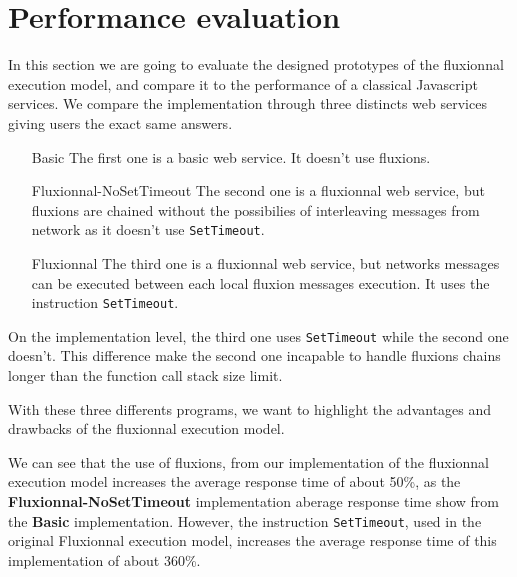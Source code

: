 \section{Performance evaluation}

In this section we are going to evaluate the designed prototypes of the fluxionnal execution model, and compare it to the performance of a classical Javascript services.
We compare the implementation through three distincts web services giving users the exact same answers.
\begin{itemize}
	\item[Basic] The first one is a basic web service. It doesn't use fluxions.
	\item[Fluxionnal-NoSetTimeout] The second one is a fluxionnal web service, but fluxions are chained without the possibilies of interleaving messages from network as it doesn't use \texttt{SetTimeout}.
	\item[Fluxionnal] The third one is a fluxionnal web service, but networks messages can be executed between each local fluxion messages execution. It uses the instruction \texttt{SetTimeout}.
\end{itemize}

On the implementation level, the third one uses \texttt{SetTimeout} while the second one doesn't.
This difference make the second one incapable to handle fluxions chains longer than the function call stack size limit.

With these three differents programs, we want to highlight the advantages and drawbacks of the fluxionnal execution model.


We can see that the use of fluxions, from our implementation of the fluxionnal execution model increases the average response time of about 50\%, as the \textbf{Fluxionnal-NoSetTimeout} implementation aberage response time show from the \textbf{Basic} implementation.
However, the instruction \texttt{SetTimeout}, used in the original Fluxionnal execution model, increases the average response time of this implementation of about 360\%.
